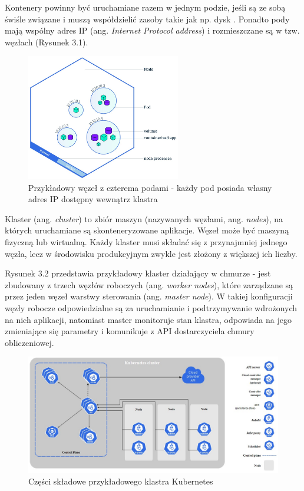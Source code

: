 Kontenery powinny być uruchamiane razem w jednym podzie, jeśli są ze sobą świśle związane i muszą współdzielić zasoby takie jak np. dysk \cite{kubernetes}. Ponadto pody mają wspólny adres IP (ang. \textit{Internet Protocol address}) i rozmieszczane są w tzw. węzłach (Rysunek 3.1). 

\begin{figure}[H]
    \centering
    \includegraphics[width=0.6\textwidth]{img/rozdzial1-4.jpg}
    \caption{Przykładowy węzeł z czterema podami - każdy pod posiada własny adres IP dostępny wewnątrz klastra \cite{kubernetes}}
\end{figure}

Klaster (ang. \textit{cluster}) to zbiór maszyn (nazywanych węzłami, ang. \textit{nodes}), na których uruchamiane są skonteneryzowane aplikacje. Węzeł może być maszyną fizyczną lub wirtualną. Każdy klaster musi składać się z przynajmniej jednego węzła, lecz w środowisku produkcyjnym zwykle jest złożony z większej ich liczby. 

Rysunek 3.2 przedstawia przykładowy klaster działający w chmurze - jest zbudowany z trzech węzłów roboczych (ang. \textit{worker nodes}), które zarządzane są przez jeden węzeł warstwy sterowania (ang. \textit{master node}). W takiej konfiguracji węzły robocze odpowiedzialne są za uruchamianie i podtrzymywanie wdrożonych na nich aplikacji, natomiast master monitoruje stan klastra, odpowiada na jego zmieniające się parametry i komunikuje z API dostarczyciela chmury obliczeniowej. 

\begin{figure}[H]
    \centering
    \includegraphics[width=1\textwidth]{img/rozdzial1-3.jpg}
    \caption{Części składowe przykładowego klastra Kubernetes \cite{kubernetes}}
\end{figure}


